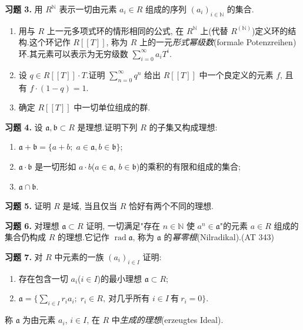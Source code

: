 \medskip
\noindent\textbf{习题 3.} 用 $R^{\mathbb{N}}$ 表示一切由元素 $a_i \in R$ 组成的序列 $(a_i)_{i \in \mathbb{N}}$ 的集合.
\begin{enumerate}
\item[(i)] 用与 $R$ 上一元多项式环的情形相同的公式, 在 $R^{\mathbb{N}}$ 上(代替 $R^{(\mathbb{N})}$)定义环的结构.这个环记作 $R[[T]]$, 称为 $R$ 上的一元\emph{形式幂级数}(\textup{formale Potenzreihen})环.其元素可以表示为无穷级数 $\sum_{i = 0}^{\infty} a_i T^i$.
\item[(ii)] 设 $q \in R[[T]] \cdot T$.证明 $\sum_{n = 0}^{\infty} q^n$ 给出 $R[[T]]$ 中一个良定义的元素 $f$, 且有 $f \cdot (1 - q) = 1$.
\item[(iii)] 确定 $R[[T]]$ 中一切单位组成的群.
\end{enumerate}

\medskip
\noindent\textbf{习题 4.} 设 $\mathfrak{a}, \mathfrak{b} \subset R$ 是理想.证明下列 $R$ 的子集又构成理想:
\begin{enumerate}
\item[(i)] $\mathfrak{a} + \mathfrak{b} = \{a + b;\; a \in \mathfrak{a}, b \in \mathfrak{b}\}$;
\item[(ii)] $\mathfrak{a} \cdot \mathfrak{b}$ 是一切形如 $a \cdot b$($a \in \mathfrak{a}$, $b \in \mathfrak{b}$)的乘积的有限和组成的集合;
\item[(iii)] $\mathfrak{a} \cap \mathfrak{b}$.
\end{enumerate}

\medskip
\noindent\textbf{习题 5.} 证明 $R$ 是域, 当且仅当 $R$ 恰好有两个不同的理想.

\medskip
\noindent\textbf{习题 6.} 对理想 $\mathfrak{a} \subset R$ 证明, 一切满足"存在 $n \in \mathbb{N}$ 使 $a^n \in \mathfrak{a}$"的元素 $a \in R$ 组成的集合仍构成 $R$ 的理想.它记作 $\operatorname{rad} \mathfrak{a}$, 称为 $\mathfrak{a}$ 的\emph{幂零根}(\textup{Nilradikal}).(AT 343)

\medskip
\noindent\textbf{习题 7.} 对 $R$ 中元素的一族 $(a_i)_{i \in I}$ 证明:
\begin{enumerate}
\item[(i)] 存在包含一切 $a_i$($i \in I$)的最小理想 $\mathfrak{a} \subset R$;
\item[(ii)] $\mathfrak{a} = \{\sum_{i \in I} r_i a_i;\; r_i \in R, \ \text{对几乎所有 } i \in I \ \text{有} \ r_i = 0\}$.
\end{enumerate}
称 $\mathfrak{a}$ 为由元素 $a_i$, $i \in I$, 在 $R$ 中\emph{生成的理想}(\textup{erzeugtes Ideal}).

